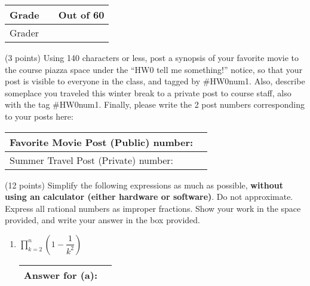 \documentclass[11pt]{article}
\begin{document}
\vspace{.1in}
\begin{table}[h]
\centering
\renewcommand{\arraystretch}{2}
\begin{tabular}{|l| l| c|}
\hline
Grade & \hspace{.75in} & Out of 60\\
\hline
Grader & \multicolumn{2}{|c|}{}\\
\hline
\end{tabular}
\end{table}





\begin{problems}
\item (3 points) Using 140 characters or less, post a synopsis of your favorite movie to the course piazza space under the ``HW0 tell me something!'' notice, so that your post is visible to everyone in the class, and tagged by \#HW0num1.  Also, describe someplace you traveled this winter break to a private post to course staff, also with the tag \#HW0num1. Finally, please write the 2 post numbers corresponding to your posts here:

\begin{table}[h]
\hspace{.3in}  
\renewcommand{\arraystretch}{2}
\begin{tabular}{|l|c| }
\hline
Favorite Movie Post (Public) number: & \hspace{2in} \\
\hline
Summer Travel Post (Private)  number: & \\ 
\hline
\end{tabular}
\end{table}

\newpage

\item (12 points)
Simplify the following expressions as much as possible,
\textbf{without using an calculator (either hardware or software)}.
Do not approximate. Express all rational numbers as improper
fractions. Show your work in the space provided, and write your answer in the box provided.
\begin{enumerate}

\item $\displaystyle\prod_{k=2}^n (1-\dfrac{1}{k^2})$ 
\vspace{1.5in} \begin{table}[!h] \flushright \renewcommand{\arraystretch}{2} \begin{tabular}{|l|c| }
\hline
Answer for (a): & \hspace{2in} \\
\hline
\end{tabular} \end{table}


\end{enumerate}
\end{problems}
\end{document}
